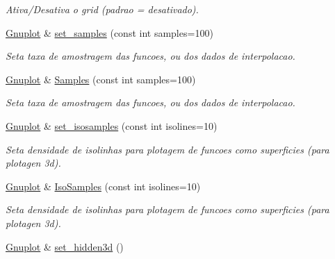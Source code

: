 \begin{DoxyCompactItemize}
\begin{DoxyCompactList}\small\item\em Ativa/\-Desativa o grid (padrao = desativado). \end{DoxyCompactList}\item 
\hypertarget{classGnuplot_a671cbe7b18a267ea59f532c83a0035f6}{\hyperlink{classGnuplot}{Gnuplot} \& \hyperlink{classGnuplot_a671cbe7b18a267ea59f532c83a0035f6}{set\-\_\-samples} (const int samples=100)}\label{classGnuplot_a671cbe7b18a267ea59f532c83a0035f6}

\begin{DoxyCompactList}\small\item\em Seta taxa de amostragem das funcoes, ou dos dados de interpolacao. \end{DoxyCompactList}\item 
\hypertarget{classGnuplot_a0be7d1bfb41fd1e44969361ab02320b9}{\hyperlink{classGnuplot}{Gnuplot} \& \hyperlink{classGnuplot_a0be7d1bfb41fd1e44969361ab02320b9}{Samples} (const int samples=100)}\label{classGnuplot_a0be7d1bfb41fd1e44969361ab02320b9}

\begin{DoxyCompactList}\small\item\em Seta taxa de amostragem das funcoes, ou dos dados de interpolacao. \end{DoxyCompactList}\item 
\hypertarget{classGnuplot_ab810fa4c02fb49ae197786c305b78702}{\hyperlink{classGnuplot}{Gnuplot} \& \hyperlink{classGnuplot_ab810fa4c02fb49ae197786c305b78702}{set\-\_\-isosamples} (const int isolines=10)}\label{classGnuplot_ab810fa4c02fb49ae197786c305b78702}

\begin{DoxyCompactList}\small\item\em Seta densidade de isolinhas para plotagem de funcoes como superficies (para plotagen 3d). \end{DoxyCompactList}\item 
\hypertarget{classGnuplot_a215f314f3bcc2c869e7379a9728e5f95}{\hyperlink{classGnuplot}{Gnuplot} \& \hyperlink{classGnuplot_a215f314f3bcc2c869e7379a9728e5f95}{Iso\-Samples} (const int isolines=10)}\label{classGnuplot_a215f314f3bcc2c869e7379a9728e5f95}

\begin{DoxyCompactList}\small\item\em Seta densidade de isolinhas para plotagem de funcoes como superficies (para plotagen 3d). \end{DoxyCompactList}\item 
\hypertarget{classGnuplot_a5ada5c76db0a735d3d331caa0eb4968a}{\hyperlink{classGnuplot}{Gnuplot} \& \hyperlink{classGnuplot_a5ada5c76db0a735d3d331caa0eb4968a}{set\-\_\-hidden3d} ()}\label{classGnuplot_a5ada5c76db0a735d3d331caa0eb4968a}


\end{DoxyCompactItemize}
